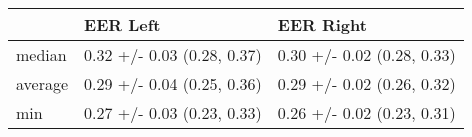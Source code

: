 \begin{tabular}{lll}
\toprule
{} &                    EER Left &                   EER Right \\
\midrule
median  &  0.32 +/- 0.03 (0.28, 0.37) &  0.30 +/- 0.02 (0.28, 0.33) \\
average &  0.29 +/- 0.04 (0.25, 0.36) &  0.29 +/- 0.02 (0.26, 0.32) \\
min     &  0.27 +/- 0.03 (0.23, 0.33) &  0.26 +/- 0.02 (0.23, 0.31) \\
\bottomrule
\end{tabular}
